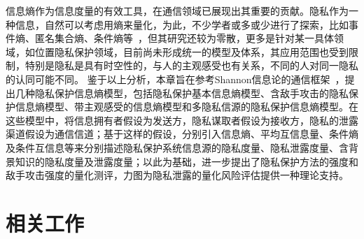 信息熵作为信息度量的有效工具，在通信领域已展现出其重要的贡献。隐私作为一种信息，自然可以考虑用熵来量化，为此，不少学者或多或少进行了探索，比如事件熵、匿名集合熵、条件熵等~\cite{serjantov2002towards,diaz2002towards,wagner2018technical}，但其研究还较为零散，更多是针对某一具体领域，如位置隐私保护领域，目前尚未形成统一的模型及体系，其应用范围也受到限制，特别是隐私是具有时空性的，与人的主观感受也有关系，不同的人对同一隐私的认同可能不同。 鉴于以上分析，本章旨在参考Shannon信息论的通信框架~\cite{stone2018information}，提出几种隐私保护信息熵模型，包括隐私保护基本信息熵模型、含敌手攻击的隐私保护信息熵模型、带主观感受的信息熵模型和多隐私信源的隐私保护信息熵模型。在这些模型中，将信息拥有者假设为发送方，隐私谋取者假设为接收方，隐私的泄露渠道假设为通信信道；基于这样的假设，分别引入信息熵、平均互信息量、条件熵及条件互信息等来分别描述隐私保护系统信息源的隐私度量、隐私泄露度量、含背景知识的隐私度量及泄露度量；以此为基础，进一步提出了隐私保护方法的强度和敌手攻击强度的量化测评，力图为隐私泄露的量化风险评估提供一种理论支持。


\section{相关工作}\label{related work}

